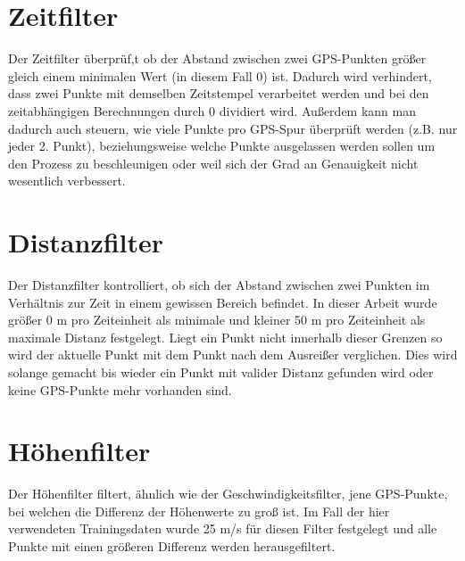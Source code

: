 \section*{Zeitfilter}
Der Zeitfilter überprüf,t ob der Abstand zwischen zwei GPS-Punkten größer gleich einem minimalen Wert (in diesem Fall 0) ist. Dadurch wird verhindert, dass zwei Punkte mit demselben Zeitstempel verarbeitet werden und bei den zeitabhängigen Berechnungen durch 0 dividiert wird. Außerdem kann man dadurch auch steuern, wie viele Punkte pro GPS-Spur überprüft werden  (z.B. nur jeder 2. Punkt), beziehungsweise welche Punkte ausgelassen werden sollen um den Prozess zu beschleunigen oder weil sich der Grad an Genauigkeit nicht wesentlich verbessert.

\section*{Distanzfilter}
Der Distanzfilter kontrolliert, ob sich der Abstand zwischen zwei Punkten im Verhältnis zur Zeit in einem gewissen Bereich befindet. In dieser Arbeit wurde größer 0 m pro Zeiteinheit als minimale und kleiner 50 m pro Zeiteinheit als maximale Distanz festgelegt. Liegt ein Punkt nicht innerhalb dieser Grenzen so wird der aktuelle Punkt mit dem Punkt nach dem Ausreißer verglichen. Dies wird solange gemacht bis wieder ein Punkt mit valider Distanz gefunden wird oder keine GPS-Punkte mehr vorhanden sind.

\section*{Höhenfilter}
Der Höhenfilter filtert, ähnlich wie der Geschwindigkeitsfilter, jene GPS-Punkte, bei welchen die Differenz der Höhenwerte zu groß ist. Im Fall der hier verwendeten Trainingsdaten wurde 25 m/s  für diesen Filter festgelegt und alle Punkte mit einen größeren Differenz werden herausgefiltert.


\clearpage